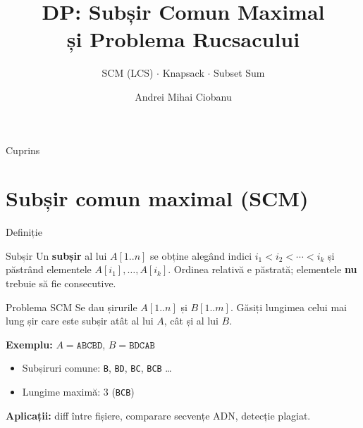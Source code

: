 \documentclass[10pt]{beamer}
\title{DP: Subșir Comun Maximal\\și Problema Rucsacului}
\subtitle{SCM (LCS) $\cdot$ Knapsack $\cdot$ Subset Sum}
\author{Andrei Mihai Ciobanu}
\institute{Algolymp Summer School}
\date{}
\begin{document}
\begin{frame}
  \titlepage
\end{frame}

\begin{frame}{Cuprins}
  \tableofcontents
\end{frame}

\section{Subșir comun maximal (SCM)}

\begin{frame}{Definiție}
  \begin{block}{Subșir}
    Un \textbf{subșir} al lui $A[1..n]$ se obține alegând indici $i_1 < i_2 < \cdots < i_k$
    și păstrând elementele $A[i_1], \ldots, A[i_k]$.
    Ordinea relativă e păstrată; elementele \textbf{nu} trebuie să fie consecutive.
  \end{block}
  \smallskip
  \begin{block}{Problema SCM}
    Se dau șirurile $A[1..n]$ și $B[1..m]$.
    Găsiți lungimea celui mai lung șir care este subșir atât al lui $A$, cât și al lui $B$.
  \end{block}
  \smallskip
  \textbf{Exemplu:} $A = \texttt{ABCBD}$, $B = \texttt{BDCAB}$
  \begin{itemize}\itemsep1pt
    \item Subșiruri comune: \texttt{B}, \texttt{BD}, \texttt{BC}, \texttt{BCB} \ldots
    \item Lungime maximă: $3$ (\texttt{BCB})
  \end{itemize}
  \smallskip
  \textbf{Aplicații:} diff între fișiere, comparare secvențe ADN, detecție plagiat.
\end{frame}
\end{document}
